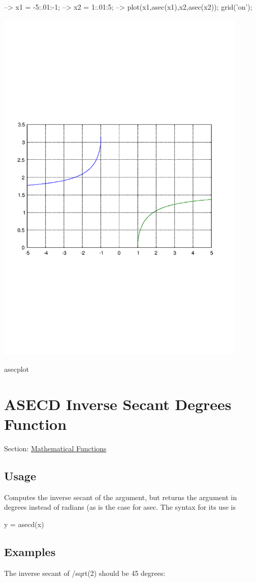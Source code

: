 \begin{DoxyVerbInclude}
--> x1 = -5:.01:-1;
--> x2 = 1:.01:5;
--> plot(x1,asec(x1),x2,asec(x2)); grid('on');
\end{DoxyVerbInclude}


 
\begin{DoxyImage}
\includegraphics[width=12cm]{asecplot}
\caption{asecplot}
\end{DoxyImage}
 \hypertarget{mathfunctions_asecd}{}\section{A\-S\-E\-C\-D Inverse Secant Degrees Function}\label{mathfunctions_asecd}
Section\-: \hyperlink{sec_mathfunctions}{Mathematical Functions} \hypertarget{vtkwidgets_vtkxyplotwidget_Usage}{}\subsection{Usage}\label{vtkwidgets_vtkxyplotwidget_Usage}
Computes the inverse secant of the argument, but returns the argument in degrees instead of radians (as is the case for {\ttfamily asec}. The syntax for its use is \begin{DoxyVerb}   y = asecd(x)
\end{DoxyVerb}
 \hypertarget{variables_matrix_Examples}{}\subsection{Examples}\label{variables_matrix_Examples}
The inverse secant of {/sqrt(2)} should be 45 degrees\-:


